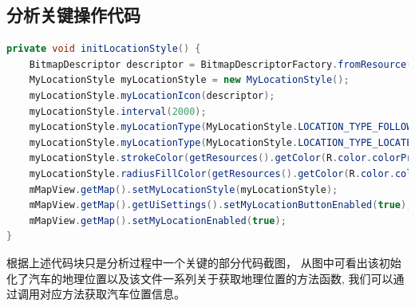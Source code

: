 \subsection{分析关键操作代码}
\begin{lstlisting}[language=Java,title={获取汽车初始化地理位置代码}]
  private void initLocationStyle() {
    BitmapDescriptor descriptor = BitmapDescriptorFactory.fromResource(R.drawable.main_location_icon);
    MyLocationStyle myLocationStyle = new MyLocationStyle();
    myLocationStyle.myLocationIcon(descriptor);
    myLocationStyle.interval(2000); 
    myLocationStyle.myLocationType(MyLocationStyle.LOCATION_TYPE_FOLLOW);
    myLocationStyle.myLocationType(MyLocationStyle.LOCATION_TYPE_LOCATE);
    myLocationStyle.strokeColor(getResources().getColor(R.color.colorPrimary));
    myLocationStyle.radiusFillColor(getResources().getColor(R.color.colorPrimary_50));
    mMapView.getMap().setMyLocationStyle(myLocationStyle);
    mMapView.getMap().getUiSettings().setMyLocationButtonEnabled(true);
    mMapView.getMap().setMyLocationEnabled(true);
}
  \end{lstlisting}
根据上述代码块只是分析过程中一个关键的部分代码截图，
从图中可看出该初始化了汽车的地理位置以及该文件一系列关于获取地理位置的方法函数,
我们可以通过调用对应方法获取汽车位置信息。
